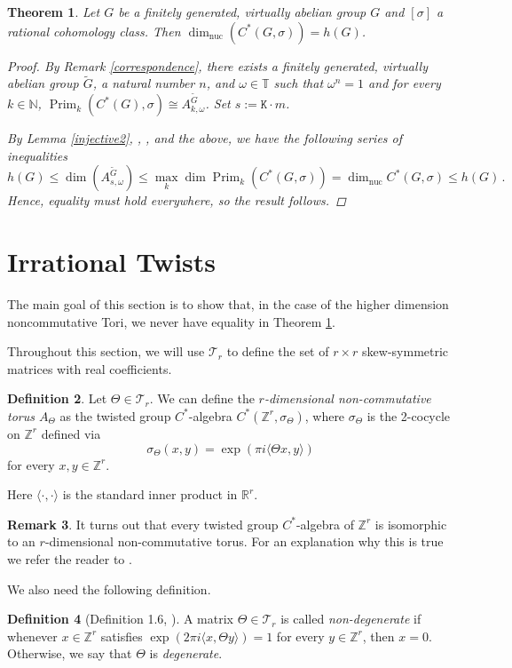 \documentclass{amsart}
\newtheorem{theorem}{Theorem}[section]
\theoremstyle{definition}
\newtheorem{remark}[theorem]{Remark}
\newtheorem{definition}[theorem]{Definition}
\newcommand{\R}{\mathbb{R}}
\newcommand{\Z}{\mathbb{Z}}
\newcommand{\N}{\mathbb{N}}
\newcommand{\TT}{\mathbb{T}}
\DeclareMathOperator{\Prim}{Prim}
\DeclareMathOperator{\nuc}{nuc}
\newcommand{\mt}{\mathtt}
\newcommand{\dimnuc}{\dim_{\nuc}}
\begin{document}
\begin{theorem}\label{main theorem}
    Let $G$ be a finitely generated, virtually abelian group $G$ and $[\sigma]$ a rational cohomology class. Then $\dimnuc(C^*(G,\sigma))=h(G)$.
    \begin{proof}
     By Remark \ref{correspondence}, there exists a finitely generated, virtually abelian group $\widetilde{G}$, a natural number $n$, and $\omega\in \TT$ such that $\omega^n=1$ and for every $k\in \N$, $\Prim_k(C^*(G),\sigma)\cong A_{k,\omega}^{\widetilde{G}}$. Set $s:=\mt{K}\cdot m$. \par
        By Lemma \ref{injective2}, \cite[Main Theorem]{Win04}, \cite[Prop. 2.14]{BL24}, and the above, we have the following series of inequalities
        $$h(G)\leq \dim(A_{s, \omega}^{\widetilde{G}})\leq \max_k\dim\Prim_k(C^*(G,\sigma))=\dimnuc C^*(G,\sigma)\leq h(G)\,.$$
        Hence, equality must hold everywhere, so the result follows.
    \end{proof}
\end{theorem}


\section{Irrational Twists}
The main goal of this section is to show that, in the case of the higher dimension noncommutative Tori, we never have equality in Theorem \ref{main theorem}. \par
Throughout this section, we will use $\mathcal{T}_r$ to define the set of $r\times r$ skew-symmetric matrices with real coefficients.
\begin{definition}\label{higher dimensional non-commutative torus}
Let $\Theta\in \mathcal{T}_r$. We can define the \emph{$r$-dimensional non-commutative torus $A_{\Theta}$} as the twisted group $C^*$-algebra $C^*(\Z^r,\sigma_{\Theta})$, where $\sigma_{\Theta}$ is the 2-cocycle on $\Z^r$ defined via
$$\sigma_{\Theta}(x,y)=\exp(\pi i \langle\Theta x,y\rangle)$$
for every $x,y\in \Z^r$. \par
Here $\langle \cdot, \cdot\rangle$ is the standard inner product in $\R^r$.
\end{definition}
\begin{remark}\label{all twisted group c* algebras are nc tori}
    It turns out that every twisted group $C^*$-algebra of $\Z^r$ is isomorphic to an $r$-dimensional non-commutative torus. For an explanation why this is true we refer the reader to \cite[Section 2.2]{elliott2006moritaequivalencesmoothnoncommutative}.
\end{remark}
We also need the following definition.
\begin{definition}[Definition 1.6, \cite{simple_nc_torus}] \label{degenerate}
  A matrix $\Theta\in \mathcal{T}_r$ is called \emph{non-degenerate} if whenever $x\in \Z^r$ satisfies $\exp(2\pi i \langle x,\Theta y\rangle)=1$ for every $y\in \Z^r$, then $x=0$. Otherwise, we say that $\Theta$ is \emph{degenerate}.
\end{definition}
\end{document}
